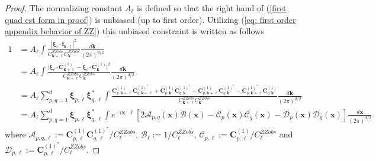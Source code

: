 \documentclass[10pt,noinfoline]{imsart}
\newcommand{\bs}{\boldsymbol}
\begin{document}
\begin{proof}
The normalizing constant $A_{\bs\ell}$ is defined so that the right hand of (\ref{first quad est form in proof}) is unbiased (up to first order). Utilizing (\ref{eq: first order appendix behavior of ZZ}) this unbiased constraint is written as follows
\begin{align}
 1 &= A_{\bs\ell}\int \frac{|\bs \xi_{\bs \ell}\cdot \bs f_{\bs k,\bs\ell}|^2}{C^{ZZobs}_{\bs k+\bs \ell} C^{ZZobs}_{\bs k}} \frac{d\bs k}{{(2\pi)}^{d/2}}  \nonumber\\
&= A_{\bs\ell}\int \frac{\bigl|\bs \xi_{\bs \ell}\cdot\bs C^{(1)}_{\bs k+\bs \ell}  - \bs\xi_{\bs \ell}\cdot\bs C^{(1)}_{\bs k} \bigr|^2}{C^{ZZobs}_{\bs k+\bs \ell} C^{ZZobs}_{\bs k}} \frac{d\bs k}{{(2\pi)}^{d/2}} 
\nonumber\\
&= A_{\bs\ell}\sum_{p,q = 1}^d\bs\xi_{p,\bs\ell}\bs\xi^*_{q,\bs\ell}\int \frac{\bs C^{(1)}_{p,\bs k+\bs \ell} \bs C^{{(1)}^*}_{q,\bs k+\bs \ell} + \bs C^{(1)}_{p,\bs k} \bs C^{{(1)}^*}_{q,\bs k}  -     \bs C^{(1)}_{p,\bs k+\bs \ell} \bs C^{{(1)}^*}_{q,\bs k} - \bs C^{{(1)}^*}_{p,\bs k+\bs \ell} \bs C^{(1)}_{q,\bs k} }{C^{ZZobs}_{\bs k+\bs\ell} C^{ZZobs}_{\bs k}} \frac{d\bs k}{{(2\pi)}^{d/2}}  \nonumber\\
&= A_{\bs\ell}\sum_{p,q = 1}^d\bs\xi_{p,\bs\ell}\bs\xi^*_{q,\bs\ell}\int  e^{-i\bs x\cdot\bs \ell} \left[2\mathscr A_{p,q}(\bs x)\mathscr B(\bs x)  - \mathscr C_{p}(\bs x)\mathscr C_{q}(\bs x) -  \mathscr D_{p}(\bs x)\mathscr D_{q}(\bs x)\right]  \frac{d\bs x}{{(2\pi)}^{d/2}}\label{Aell derivation 11}
\end{align}
where $\mathscr A_{p,q, \bs\ell}:= \bs C^{(1)}_{p,\bs\ell} \bs C^{{(1)}^*}_{q,\bs\ell}  / C^{ZZobs}_{\bs\ell}$, $\mathscr B_{\bs\ell}:= 1/C^{ZZobs}_{\bs\ell}$, $\mathscr C_{p,\bs\ell}:= \bs C^{(1)}_{p,\bs\ell}  / C^{ZZobs}_{\bs\ell}$ and $\mathscr D_{p,\bs\ell}:= \bs C^{{(1)}^*}_{p,\bs\ell}  / C^{ZZobs}_{\bs\ell}$.

\end{proof}
\end{document}
